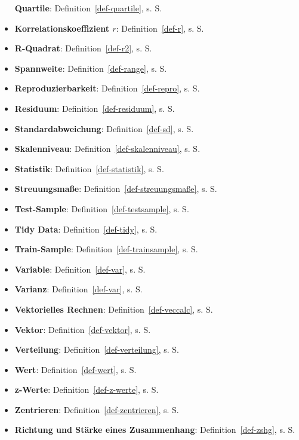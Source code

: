 \documentclass[
  letterpaper,
  twoside,
  open=any]{scrbook}
\theoremstyle{definition}
\theoremstyle{definition}
\theoremstyle{definition}
\theoremstyle{remark}
\begin{document}
\begin{itemize}
  \textbf{Quartile}: Definition~\ref{def-quartile}, s. S.
  \pageref{def-quartile}
\item
  \textbf{Korrelationskoeffizient \(r\)}: Definition~\ref{def-r}, s. S.
  \pageref{def-r}
\item
  \textbf{R-Quadrat}: Definition~\ref{def-r2}, s. S. \pageref{def-r2}
\item
  \textbf{Spannweite}: Definition~\ref{def-range}, s. S.
  \pageref{def-range}
\item
  \textbf{Reproduzierbarkeit}: Definition~\ref{def-repro}, s. S.
  \pageref{def-repro}
\item
  \textbf{Residuum}: Definition~\ref{def-residuum}, s. S.
  \pageref{def-residuum}
\item
  \textbf{Standardabweichung}: Definition~\ref{def-sd}, s. S.
  \pageref{def-sd}
\item
  \textbf{Skalenniveau}: Definition~\ref{def-skalenniveau}, s. S.
  \pageref{def-skalenniveau}
\item
  \textbf{Statistik}: Definition~\ref{def-statistik}, s. S.
  \pageref{def-statistik}
\item
  \textbf{Streuungsmaße}: Definition~\ref{def-streuungsmaße}, s. S.
  \pageref{def-streuungsmaße}
\item
  \textbf{Test-Sample}: Definition~\ref{def-testsample}, s. S.
  \pageref{def-testsample}
\item
  \textbf{Tidy Data}: Definition~\ref{def-tidy}, s. S.
  \pageref{def-tidy}
\item
  \textbf{Train-Sample}: Definition~\ref{def-trainsample}, s. S.
  \pageref{def-trainsample}
\item
  \textbf{Variable}: Definition~\ref{def-var}, s. S. \pageref{def-var}
\item
  \textbf{Varianz}: Definition~\ref{def-var}, s. S. \pageref{def-var}
\item
  \textbf{Vektorielles Rechnen}: Definition~\ref{def-veccalc}, s. S.
  \pageref{def-veccalc}
\item
  \textbf{Vektor}: Definition~\ref{def-vektor}, s. S.
  \pageref{def-vektor}
\item
  \textbf{Verteilung}: Definition~\ref{def-verteilung}, s. S.
  \pageref{def-verteilung}
\item
  \textbf{Wert}: Definition~\ref{def-wert}, s. S. \pageref{def-wert}
\item
  \textbf{z-Werte}: Definition~\ref{def-z-werte}, s. S.
  \pageref{def-z-werte}
\item
  \textbf{Zentrieren}: Definition~\ref{def-zentrieren}, s. S.
  \pageref{def-zentrieren}
\item
  \textbf{Richtung und Stärke eines Zusammenhang}:
  Definition~\ref{def-zshg}, s. S. \pageref{def-zshg}
\end{itemize}
\end{document}
